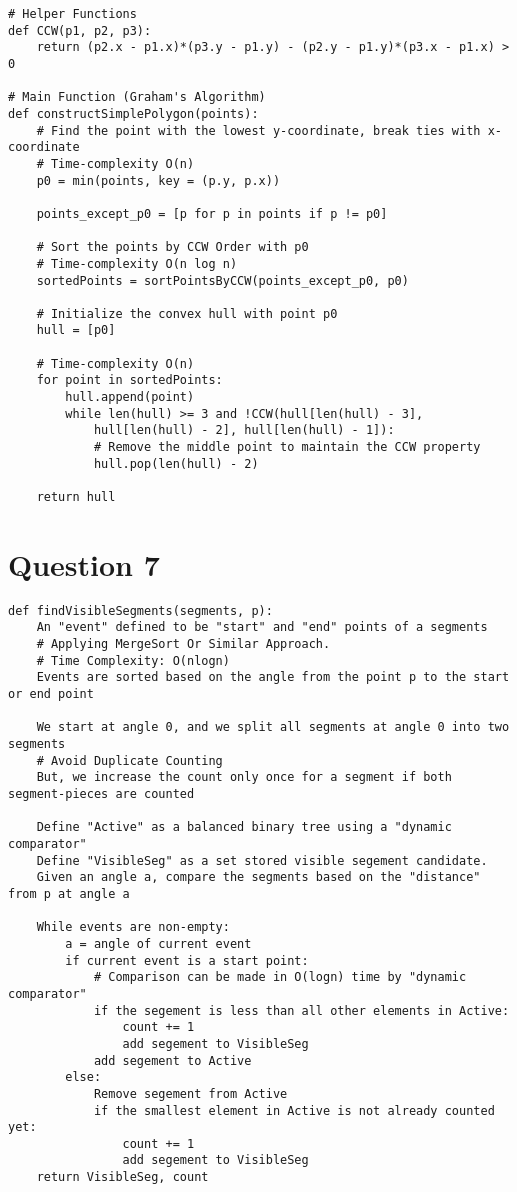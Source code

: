 \documentclass{article}
\begin{document}
\begin{verbatim}
# Helper Functions
def CCW(p1, p2, p3):
    return (p2.x - p1.x)*(p3.y - p1.y) - (p2.y - p1.y)*(p3.x - p1.x) > 0

# Main Function (Graham's Algorithm)
def constructSimplePolygon(points):
    # Find the point with the lowest y-coordinate, break ties with x-coordinate
    # Time-complexity O(n)
    p0 = min(points, key = (p.y, p.x))

    points_except_p0 = [p for p in points if p != p0]

    # Sort the points by CCW Order with p0
    # Time-complexity O(n log n)
    sortedPoints = sortPointsByCCW(points_except_p0, p0)

    # Initialize the convex hull with point p0
    hull = [p0]

    # Time-complexity O(n)
    for point in sortedPoints:
        hull.append(point)
        while len(hull) >= 3 and !CCW(hull[len(hull) - 3], 
            hull[len(hull) - 2], hull[len(hull) - 1]):
            # Remove the middle point to maintain the CCW property
            hull.pop(len(hull) - 2)

    return hull
\end{verbatim}

\newpage

\section*{Question 7}

\begin{verbatim}
def findVisibleSegments(segments, p):
    An "event" defined to be "start" and "end" points of a segments
    # Applying MergeSort Or Similar Approach.
    # Time Complexity: O(nlogn)
    Events are sorted based on the angle from the point p to the start or end point
    
    We start at angle 0, and we split all segments at angle 0 into two segments
    # Avoid Duplicate Counting
    But, we increase the count only once for a segment if both segment-pieces are counted

    Define "Active" as a balanced binary tree using a "dynamic comparator"
    Define "VisibleSeg" as a set stored visible segement candidate.
    Given an angle a, compare the segments based on the "distance" from p at angle a

    While events are non-empty:
        a = angle of current event
        if current event is a start point:
            # Comparison can be made in O(logn) time by "dynamic comparator"
            if the segement is less than all other elements in Active:
                count += 1
                add segement to VisibleSeg
            add segement to Active
        else:
            Remove segement from Active
            if the smallest element in Active is not already counted yet:
                count += 1
                add segement to VisibleSeg
    return VisibleSeg, count
\end{verbatim}
\end{document}
